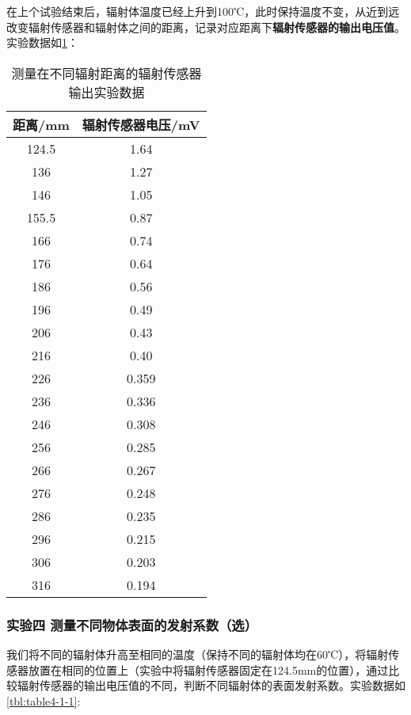 \documentclass[dvipsnames, svgnames,a4paper,11pt]{article}
\begin{document}
	在上个试验结束后，辐射体温度已经上升到100℃，此时保持温度不变，从近到远改变辐射传感器和辐射体之间的距离，记录对应距离下\textbf{辐射传感器的输出电压值}。实验数据如\cref{tbl:table3-1-1}：

	\begin{table}[htbp]
		\centering
		\begin{tabular}{|cc|} 
		\hline
		距离/mm & 辐射传感器电压/mV  \\ 
		\hline
		124.5 & 1.64        \\
		136   & 1.27        \\
		146   & 1.05        \\
		155.5 & 0.87        \\
		166   & 0.74        \\
		176   & 0.64        \\
		186   & 0.56        \\
		196   & 0.49        \\
		206   & 0.43        \\
		216   & 0.40        \\
		226   & 0.359       \\
		236   & 0.336       \\
		246   & 0.308       \\
		256   & 0.285       \\
		266   & 0.267       \\
		276   & 0.248       \\
		286   & 0.235       \\
		296   & 0.215       \\
		306   & 0.203       \\
		316   & 0.194       \\
		\hline
		\end{tabular}
		\caption{测量在不同辐射距离的辐射传感器输出实验数据}
		\label{tbl:table3-1-1}
	\end{table}










\subsubsection{实验四 \quad 测量不同物体表面的发射系数（选）}

	我们将不同的辐射体升高至相同的温度（保持不同的辐射体均在60℃），将辐射传感器放置在相同的位置上（实验中将辐射传感器固定在124.5mm的位置），通过比较辐射传感器的输出电压值的不同，判断不同辐射体的表面发射系数。实验数据如\cref{tbl:table4-1-1}:
\end{document}
